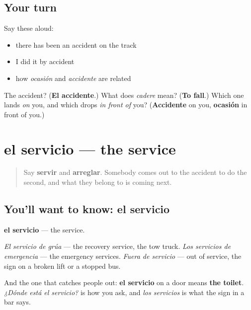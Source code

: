 \subsection*{Your turn}
Say these aloud:

\begin{itemize}
\raggedright
  \item there has been an accident on the track
  \item I did it by accident
  \item how \emph{ocasión} and \emph{accidente} are related
\end{itemize}

\begin{tcolorbox}[breakable,colback=teal!4,colframe=teal!35!black,title={Before you move on}]
The accident? (\textbf{El accidente}.) What does \emph{cadere} mean? (\textbf{To fall}.) Which one lands \emph{on} you, and which drops \emph{in front of} you? (\textbf{Accidente} on you, \textbf{ocasión} in front of you.)
\end{tcolorbox}
\section[el servicio]{el servicio — the service}

\label{lesson:ES-C454-servicio}



\begin{quote}
Say \textbf{servir} and \textbf{arreglar}. Somebody comes out to the accident to do the second, and what they belong to is coming next.
\end{quote}

\subsection*{You'll want to know: el servicio}
\textbf{el servicio} — the service.

\emph{El servicio de grúa} — the recovery service, the tow truck. \emph{Los servicios de emergencia} — the emergency services. \emph{Fuera de servicio} — out of service, the sign on a broken lift or a stopped bus.

And the one that catches people out: \textbf{el servicio} on a door means \textbf{the toilet}. \emph{¿Dónde está el servicio?} is how you ask, and \emph{los servicios} is what the sign in a bar says.

